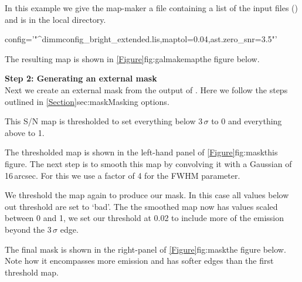In this example we give the map-maker a file containing a list of the
input files () and
 is in the local directory.

\begin{terminalv}
          config='"^dimmconfig_bright_extended.lis,maptol=0.04,ast.zero_snr=3.5"'
\end{terminalv}
The resulting map is shown in \cref{Figure}{fig:galmakemap}{the figure below}.


\textbf{Step 2: Generating an external mask}
\vspace{0.2cm}\\
Next we create an external mask from the output of \makemap. Here we
follow the steps outlined in \cref{Section}{sec:mask}{Masking options}.

\begin{terminalv}
\end{terminalv}

This S/N map is thresholded to set everything below 3\,$\sigma$ to 0 and
everything above to 1.

\begin{terminalv}
\end{terminalv}
The thresholded map is shown in the left-hand panel of
\cref{Figure}{fig:mask}{this figure}. The next step is to smooth this map
by convolving it with a Gaussian of 16\,arcsec. For this we use a factor
of 4 for the FWHM parameter.

\begin{terminalv}
\end{terminalv}

We threshold the map again to produce our mask. In this case all
values below out threshold are set to `bad'. The the smoothed map now
has values scaled between 0 and 1, we set our threshold at 0.02 to
include more of the emission beyond the 3\,$\sigma$ edge.
\begin{terminalv}
\end{terminalv}
The final mask is shown in the right-panel of \cref{Figure}{fig:mask}{the figure below}.
Note how it encompasses more emission and has softer edges than the
first threshold map. \\

